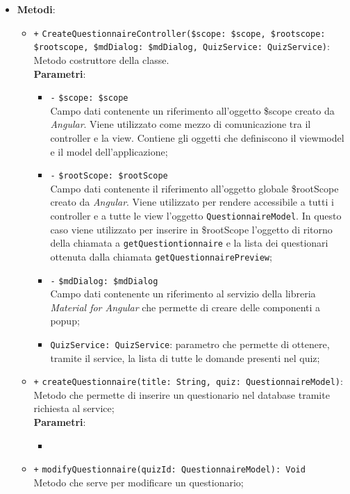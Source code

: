 \begin{itemize}
\begin{itemize}
		
	\end{itemize}
	\item \textbf{Metodi}:
	\begin{itemize}
		\item \texttt{+} \texttt{CreateQuestionnaireController(\$scope: \$scope, \$rootscope: \$rootscope, \$mdDialog: \$mdDialog, QuizService: QuizService)}: \\ Metodo costruttore della classe. \\
		\textbf{Parametri}:
		\begin{itemize}
			\item \texttt{-} \texttt{\$scope: \$scope} \\
			Campo dati contenente un riferimento all’oggetto \$scope creato da \textit{Angular}. Viene utilizzato come mezzo di comunicazione tra il controller e la view. Contiene gli oggetti che definiscono il viewmodel e il model dell’applicazione;
				\item \texttt{-} \texttt{\$rootScope: \$rootScope} \\
				Campo dati contenente il riferimento all'oggetto globale \$rootScope creato da \textit{Angular}. Viene utilizzato per rendere accessibile a tutti i controller e a tutte le view l'oggetto \texttt{QuestionnaireModel}. In questo caso viene utilizzato per inserire in \$rootScope l'oggetto di ritorno della chiamata a \texttt{getQuestiontionnaire} e la lista dei questionari ottenuta dalla chiamata \texttt{getQuestionnairePreview};
			\item \texttt{-} \texttt{\$mdDialog: \$mdDialog} \\
			Campo dati contenente un riferimento al servizio della libreria \textit{Material for Angular} che permette di creare delle componenti a popup;
			\item \texttt{QuizService: QuizService}: parametro che permette di ottenere, tramite il service, la lista di tutte le domande presenti nel quiz;
		\end{itemize}
		\item \texttt{+} \texttt{createQuestionnaire(title: String, quiz: QuestionnaireModel)}: \\Metodo che permette di inserire un questionario nel database tramite richiesta al service; \\
			\textbf{Parametri}:
			\begin{itemize}
				\item 
			\end{itemize}
		\item \texttt{+} \texttt{modifyQuestionnaire(quizId: QuestionnaireModel): Void} \\ Metodo che serve per modificare un questionario; \\

\end{itemize}
\end{itemize}

